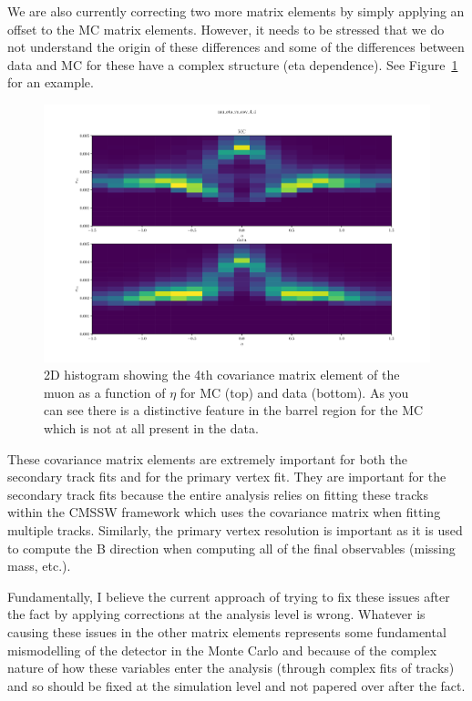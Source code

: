\documentclass[12pt]{report}
\begin{document}
We are also currently correcting two more matrix elements by simply applying an
offset to the MC matrix elements. However, it needs to be stressed that we do
not understand the origin of these differences and some of the differences
between data and MC for these have a complex structure (eta dependence). See
Figure~\ref{fig:mu-eta-vs-cov-4-4} for an example.

\begin{figure}
\centering
\includegraphics[width=\linewidth]{mu_eta_vs_cov_4_4.png}
\caption{2D histogram showing the 4th covariance matrix element of the muon as a function of $\eta$ for MC (top) and data (bottom). As you can see there is a distinctive feature in the barrel region for the MC which is not at all present in the data.}
\label{fig:mu-eta-vs-cov-4-4}
\end{figure}

These covariance matrix elements are extremely important for both the secondary
track fits and for the primary vertex fit. They are important for the secondary
track fits because the entire analysis relies on fitting these tracks within
the CMSSW framework which uses the covariance matrix when fitting multiple
tracks. Similarly, the primary vertex resolution is important as it is used to
compute the B direction when computing all of the final observables (missing
mass, etc.).

Fundamentally, I believe the current approach of trying to fix these issues
after the fact by applying corrections at the analysis level is wrong. Whatever
is causing these issues in the other matrix elements represents some
fundamental mismodelling of the detector in the Monte Carlo and because of the
complex nature of how these variables enter the analysis (through complex fits
of tracks) and so should be fixed at the simulation level and not papered over
after the fact.
\end{document}
